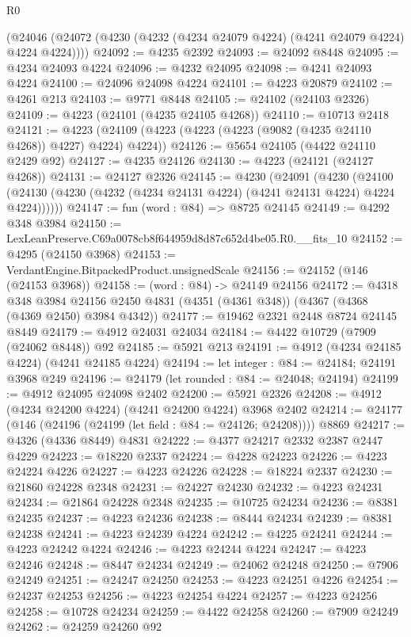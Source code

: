 \begin{lexlean}{R0}
\begin{coremodule}
    (@24046 (@24072 (@4230 (@4232 (@4234 @24079 @4224) (@4241 @24079 @4224) @4224 @4224))))
@24092 := @4235 @2392
@24093 := @24092 @8448
@24095 := @4234 @24093 @4224
@24096 := @4232 @24095
@24098 := @4241 @24093 @4224
@24100 := @24096 @24098 @4224
@24101 := @4223 @20879
@24102 := @4261 @213
@24103 := @9771 @8448
@24105 := @24102 (@24103 @2326)
@24109 := @4223 (@24101 (@4235 @24105 @4268))
@24110 := @10713 @2418
@24121 := @4223 (@24109 (@4223 (@4223 (@4223 (@9082 (@4235 @24110 @4268)) @4227) @4224) @4224))
@24126 := @5654 @24105 (@4422 @24110 @2429 @92)
@24127 := @4235 @24126
@24130 := @4223 (@24121 (@24127 @4268))
@24131 := @24127 @2326
@24145 := @4230
    (@24091
      (@4230
        (@24100 (@24130 (@4230 (@4232 (@4234 @24131 @4224) (@4241 @24131 @4224) @4224 @4224))))))
@24147 := fun (word : @84) => @8725 @24145
@24149 := @4292 @348 @3984
@24150 := LexLeanPreserve.C69a0078cb8f644959d8d87c652d4be05.R0.__fits_10
@24152 := @4295 (@24150 @3968)
@24153 := VerdantEngine.BitpackedProduct.unsignedScale
@24156 := @24152 (@146 (@24153 @3968))
@24158 := (word : @84) -> @24149 @24156
@24172 := @4318
    @348
    @3984
    @24156
    @2450
    @4831
    (@4351 (@4361 @348))
    (@4367 (@4368 (@4369 @2450) @3984 @4342))
@24177 := @19462 @2321 @2448 @8724 @24145 @8449
@24179 := @4912 @24031 @24034
@24184 := @4422 @10729 (@7909 (@24062 @8448)) @92
@24185 := @5921 @213
@24191 := @4912 (@4234 @24185 @4224) (@4241 @24185 @4224)
@24194 := let integer : @84 := @24184; @24191 @3968 @249
@24196 := @24179 (let rounded : @84 := @24048; @24194)
@24199 := @4912 @24095 @24098 @2402
@24200 := @5921 @2326
@24208 := @4912 (@4234 @24200 @4224) (@4241 @24200 @4224) @3968 @2402
@24214 := @24177 (@146 (@24196 (@24199 (let field : @84 := @24126; @24208)))) @8869
@24217 := @4326 (@4336 @8449) @4831
@24222 := @4377 @24217 @2332 @2387 @2447 @4229
@24223 := @18220 @2337
@24224 := @4228 @24223
@24226 := @4223 @24224 @4226
@24227 := @4223 @24226
@24228 := @18224 @2337
@24230 := @21860 @24228 @2348
@24231 := @24227 @24230
@24232 := @4223 @24231
@24234 := @21864 @24228 @2348
@24235 := @10725 @24234
@24236 := @8381 @24235
@24237 := @4223 @24236
@24238 := @8444 @24234
@24239 := @8381 @24238
@24241 := @4223 @24239 @4224
@24242 := @4225 @24241
@24244 := @4223 @24242 @4224
@24246 := @4223 @24244 @4224
@24247 := @4223 @24246
@24248 := @8447 @24234
@24249 := @24062 @24248
@24250 := @7906 @24249
@24251 := @24247 @24250
@24253 := @4223 @24251 @4226
@24254 := @24237 @24253
@24256 := @4223 @24254 @4224
@24257 := @4223 @24256
@24258 := @10728 @24234
@24259 := @4422 @24258
@24260 := @7909 @24249
@24262 := @24259 @24260 @92

\end{coremodule}
\end{lexlean}
